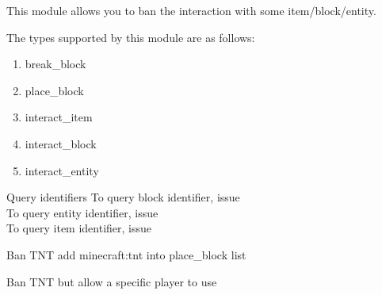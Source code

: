 
This module allows you to ban the interaction with some item/block/entity.

The types supported by this module are as follows:
\begin{enumerate}
    \item break\_block
    \item place\_block
    \item interact\_item
    \item interact\_block
    \item interact\_entity
\end{enumerate}

\begin{tips}{Query identifiers}
    To query block identifier, issue \\
    To query entity identifier, issue \\
    To query item identifier, issue 
\end{tips}

\begin{example}{Ban TNT}
    add minecraft:tnt into place\_block list
\end{example}

\begin{example}{Ban TNT but allow a specific player to use}
\end{example}


